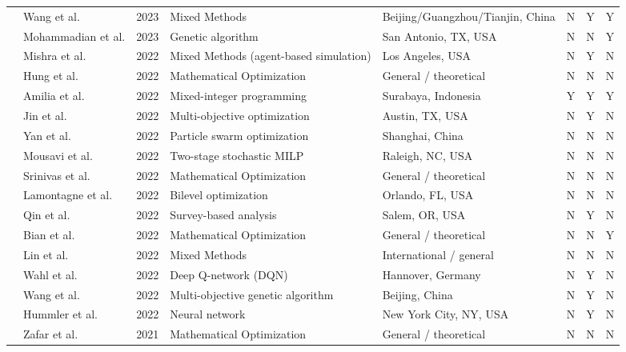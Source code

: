 \documentclass[letterpaper, 12pt, oneside, doublespacing]{Thesis}
\begin{document}
\begin{longtable}{L{0.9cm} L{1.8cm} L{0.7cm} L{2.5cm} L{2.1cm} L{0.7cm} L{0.7cm} L{0.7cm}}
\cite{spap_simultaneous_2023} & Wang et al. & 2023 & Mixed Methods & Beijing{\slash}Guangzhou{\slash}Tianjin, China & N & Y & Y \\
\cite{spatial_arbitrage_2023} & Mohammadian et al. & 2023 & Genetic algorithm & San Antonio, TX, USA & N & N & Y \\
\cite{a_framework_2022} & Mishra et al. & 2022 & Mixed Methods (agent-based simulation) & Los Angeles, USA & N & Y & N \\
\cite{a_novel_2022} & Hung et al. & 2022 & Mathematical Optimization & General {\slash} theoretical & N & N & N \\
\cite{designing_an_2022} & Amilia et al. & 2022 & Mixed-integer programming & Surabaya, Indonesia & Y & Y & Y \\
\cite{development_of_2022} & Jin et al. & 2022 & Multi-objective optimization & Austin, TX, USA & N & Y & N \\
\cite{distributed_coordination_2022} & Yan et al. & 2022 & Particle swarm optimization & Shanghai, China & N & N & N \\
\cite{ev_charging_2022} & Mousavi et al. & 2022 & Two-stage stochastic MILP & Raleigh, NC, USA & N & N & N \\
\cite{optimal_placement_2022} & Srinivas et al. & 2022 & Mathematical Optimization & General {\slash} theoretical & N & N & N \\
\cite{optimising_electric_2022} & Lamontagne et al. & 2022 & Bilevel optimization & Orlando, FL, USA & N & N & N \\
\cite{performance_analysis_2022} & Qin et al. & 2022 & Survey-based analysis & Salem, OR, USA & N & Y & N \\
\cite{planning_of_2022} & Bian et al. & 2022 & Mathematical Optimization & General {\slash} theoretical & N & N & Y \\
\cite{predictive_energy_2022} & Lin et al. & 2022 & Mixed Methods & International {\slash} general & N & N & N \\
\cite{reinforcement_learning-based_2022} & Wahl et al. & 2022 & Deep Q-network (DQN) & Hannover, Germany & N & Y & N \\
\cite{research_on_2022} & Wang et al. & 2022 & Multi-objective genetic algorithm & Beijing, China & N & Y & N \\
\cite{web_mining_2022} & Hummler et al. & 2022 & Neural network & New York City, NY, USA & N & Y & N \\
\cite{a_gis-based_2021} & Zafar et al. & 2021 & Mathematical Optimization & General {\slash} theoretical & N & N & N \\

\end{longtable}
\end{document}
